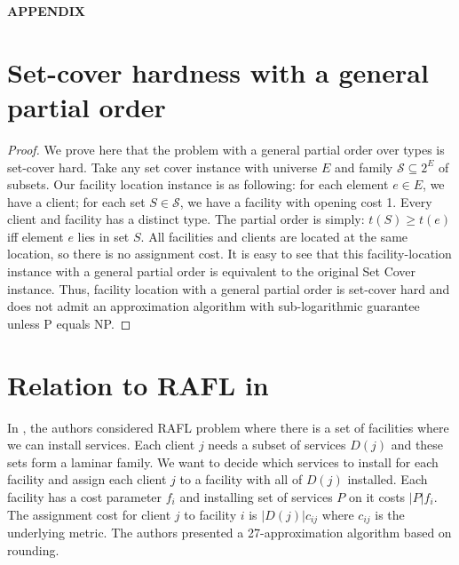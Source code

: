 \begin{center}
\textbf{APPENDIX}
\end{center}

\section{Set-cover hardness with a general partial order}
\begin{proof}
We prove here that the problem with a general partial order over types is set-cover
hard. Take any set cover instance with universe $E$ and family $\mathcal{S}\subseteq 2^E$
of subsets. %
Our facility location instance is as following: for each element $e \in E$, we have a
client; for each set $S \in \mathcal{S}$, we have a facility with opening cost 1. 
Every client and facility has a distinct type. The partial order is simply: 
$t(S)\geq t(e)$ iff element $e$ lies in set $S$. 
All facilities and clients are located at the same location, so
there is no assignment cost. It is easy to see that this facility-location instance with a
general partial order is equivalent to the original Set Cover instance. Thus, facility
location with a general partial order is set-cover hard and does not admit an
approximation algorithm with sub-logarithmic guarantee unless P equals NP. 
\end{proof}

\section{Relation to RAFL in \cite{DBLP:journals/corr/abs-1110-4150}}

In \cite{DBLP:journals/corr/abs-1110-4150}, the authors considered RAFL problem where there is a set of facilities where we can install services. Each client $j$ needs a subset of services $D(j)$ and these sets form a laminar family. We want to decide which services to install for each facility and assign each client $j$ to a facility with all of $D(j)$ installed. Each facility has a cost parameter $f_i$ and installing set of services $P$ on it costs $|P|f_i$. The assignment cost for client $j$ to facility $i$ is $|D(j)|c_{ij}$ where $c_{ij}$ is the underlying metric. The authors presented a 27-approximation algorithm based on rounding.

